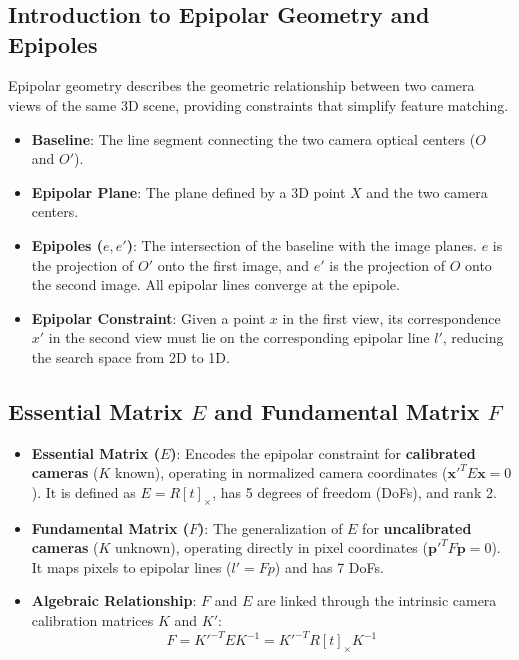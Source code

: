 
\section[Question -- {\it Two-View Epipolar Geometry and Reconstruction}]{}

\subsection{Introduction to Epipolar Geometry and Epipoles}
Epipolar geometry describes the geometric relationship between two camera views of the same 3D scene, providing constraints that simplify feature matching.
\begin{itemize}
    \item \textbf{Baseline}: The line segment connecting the two camera optical centers ($O$ and $O'$).
    \item \textbf{Epipolar Plane}: The plane defined by a 3D point $X$ and the two camera centers.
    \item \textbf{Epipoles ($e, e'$)}: The intersection of the baseline with the image planes. $e$ is the projection of $O'$ onto the first image, and $e'$ is the projection of $O$ onto the second image. All epipolar lines converge at the epipole.
    \item \textbf{Epipolar Constraint}: Given a point $x$ in the first view, its correspondence $x'$ in the second view must lie on the corresponding epipolar line $l'$, reducing the search space from 2D to 1D.
\end{itemize}

\subsection{Essential Matrix $E$ and Fundamental Matrix $F$}
\begin{itemize}
    \item \textbf{Essential Matrix ($E$)}: Encodes the epipolar constraint for \textbf{calibrated cameras} ($K$ known), operating in normalized camera coordinates ($\mathbf{x}'^T E \mathbf{x} = 0$). It is defined as $E = R[t]_\times$, has 5 degrees of freedom (DoFs), and rank 2.
    \item \textbf{Fundamental Matrix ($F$)}: The generalization of $E$ for \textbf{uncalibrated cameras} ($K$ unknown), operating directly in pixel coordinates ($\mathbf{p}'^T F \mathbf{p} = 0$). It maps pixels to epipolar lines ($l' = Fp$) and has 7 DoFs.
    \item \textbf{Algebraic Relationship}: $F$ and $E$ are linked through the intrinsic camera calibration matrices $K$ and $K'$:
    \[
      F = K'^{-T} E K^{-1} = K'^{-T} R [t]_\times K^{-1}
    \]
\end{itemize}

